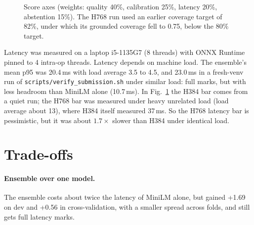 \documentclass[11pt,a4paper]{article}
\begin{document}
\begin{figure}[h]
\centering
{}
\caption{Score axes (weights: quality 40\%, calibration 25\%, latency 20\%,
abstention 15\%). The H768 run used an earlier coverage target of 82\%, under which its
grounded coverage fell to 0.75, below the 80\% target.}
\label{fig:scores}
\end{figure}

Latency was measured on a laptop i5-1135G7 (8 threads) with ONNX Runtime pinned to 4
intra-op threads. Latency depends on machine load. The ensemble's mean p95 was
20.4\,ms with load average 3.5 to 4.5, and 23.0\,ms in a fresh-venv run of
\texttt{scripts/verify\_submission.sh} under similar load: full marks, but with
less headroom than MiniLM alone (10.7\,ms). In Fig.~\ref{fig:scores} the H384 bar comes from a quiet run;
the H768 bar was measured under heavy unrelated load (load average about 13),
where H384 itself measured 37\,ms. So the H768 latency bar is pessimistic, but
it was about $1.7\times$ slower than H384 under identical load.

\section{Trade-offs}

\paragraph{Ensemble over one model.} The ensemble costs about twice the latency
of MiniLM alone, but gained +1.69 on dev and +0.56 in cross-validation, with a
smaller spread across folds, and still gets full latency marks.
\end{document}
